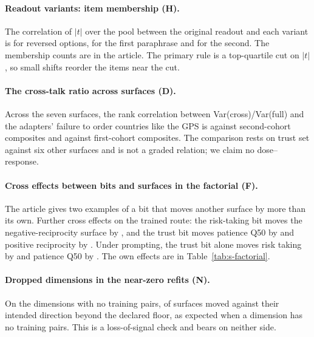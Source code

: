 \documentclass[12pt]{article}
\begin{document}
\paragraph{Readout variants: item membership (H).} The correlation of $|t|$ over the pool between the original readout and each variant is  for reversed options,  for the first paraphrase and  for the second. The membership counts are in the article. The primary rule is a top-quartile cut on $|t|$, so small shifts reorder the items near the cut.

\paragraph{The cross-talk ratio across surfaces (D).} Across the seven surfaces, the rank correlation between Var(cross)/Var(full) and the adapters' failure to order countries like the GPS is  against second-cohort composites and  against first-cohort composites. The comparison rests on trust set against six other surfaces and is not a graded relation; we claim no dose--response.

\paragraph{Cross effects between bits and surfaces in the factorial (F).} The article gives two examples of a bit that moves another surface by more than its own. Further cross effects on the trained route: the risk-taking bit moves the negative-reciprocity surface by , and the trust bit moves patience Q50 by  and positive reciprocity by . Under prompting, the trust bit alone moves risk taking by  and patience Q50 by . The own effects are in Table~\ref{tab:s-factorial}.

\paragraph{Dropped dimensions in the near-zero refits (N).} On the dimensions with no training pairs,  of  surfaces moved against their intended direction beyond the declared floor, as expected when a dimension has no training pairs. This is a loss-of-signal check and bears on neither side.
\end{document}
